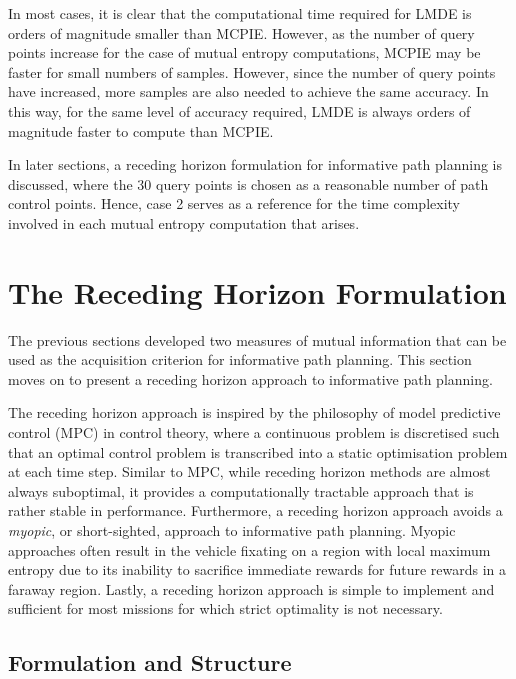 		In most cases, it is clear that the computational time required for LMDE is orders of magnitude smaller than MCPIE. However, as the number of query points increase for the case of mutual entropy computations, MCPIE may be faster for small numbers of samples. However, since the number of query points have increased, more samples are also needed to achieve the same accuracy. In this way, for the same level of accuracy required, LMDE is always orders of magnitude faster to compute than MCPIE.
		
		In later sections, a receding horizon formulation for informative path planning is discussed, where the 30 query points is chosen as a reasonable number of path control points. Hence, case 2 serves as a reference for the time complexity involved in each mutual entropy computation that arises.

	\section{The Receding Horizon Formulation}
	\label{InformativeSeafloorExploration:RecedingHorizonFormulation}
	
		The previous sections developed two measures of mutual information that can be used as the acquisition criterion for informative path planning. This section moves on to present a receding horizon approach to informative path planning.
		
		The receding horizon approach is inspired by the philosophy of model predictive control (MPC) in control theory, where a continuous problem is discretised such that an optimal control problem is transcribed into a static optimisation problem at each time step. Similar to MPC, while receding horizon methods are almost always suboptimal, it provides a computationally tractable approach that is rather stable in performance. Furthermore, a receding horizon approach avoids a \textit{myopic}, or short-sighted, approach to informative path planning. Myopic approaches often result in the vehicle fixating on a region with local maximum entropy due to its inability to sacrifice immediate rewards for future rewards in a faraway region. Lastly, a receding horizon approach is simple to implement and sufficient for most missions for which strict optimality is not necessary.
		
		\subsection{Formulation and Structure}
		\label{InformativeSeafloorExploration:RecedingHorizonFormulation:Structure}
		
